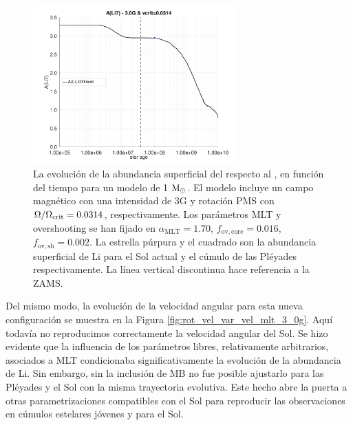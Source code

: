 \begin{figure}
    \centering
    \includegraphics[width=0.7\textwidth]{img/paper1/li_3_0g_0314vc.pdf}
	\caption{La evolución de la abundancia superficial del  respecto al , en función del tiempo para un modelo de 1 $\mathrm{M}_\odot$. El modelo incluye un campo magnético con una intensidad de 3G y rotación PMS con $\Omega / \Omega_{\mathrm{crit}}= 0.0314$, respectivamente. Los parámetros MLT y overshooting se han fijado en $\alpha_\mathrm{MLT}=1.70$, $f_\mathrm{ov,core}=0.016$, $f_\mathrm{ov,sh}=0.002$. La estrella púrpura y el cuadrado son la abundancia superficial de Li para el Sol actual \cite{Asplund2009} y el cúmulo de las Pléyades \cite{Sestito2005} respectivamente. La línea vertical discontinua hace referencia a la ZAMS.}
	\label{fig:li_3_0g_0314vc}
\end{figure}

Del mismo modo, la evolución de la velocidad angular para esta nueva configuración se muestra en la Figura \ref{fig:rot_vel_var_vel_mlt_3_0g}. Aquí todavía no reproducimos correctamente la velocidad angular del Sol. Se hizo evidente que la influencia de los parámetros libres, relativamente arbitrarios, asociados a MLT condicionaba significativamente la evolución de la abundancia de Li. Sin embargo, sin la inclusión de MB no fue posible ajustarlo para las Pléyades y el Sol con la misma trayectoria evolutiva. Este hecho abre la puerta a otras parametrizaciones compatibles con el Sol para reproducir las observaciones en cúmulos estelares jóvenes y para el Sol.\par

